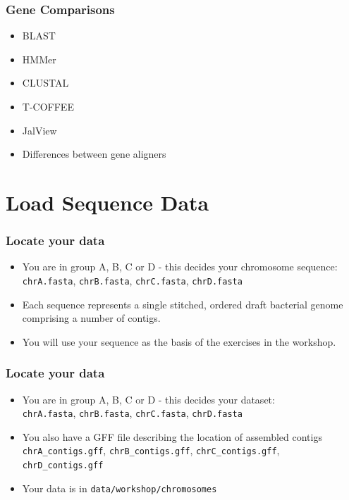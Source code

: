 \documentclass[table]{beamer}
\begin{document}
    \begin{frame}
     \frametitle{Gene Comparisons}
     \begin{itemize}
       \item BLAST
       \item HMMer
       \item CLUSTAL
       \item T-COFFEE
       \item JalView
       \item Differences between gene aligners
     \end{itemize}
    \end{frame}


  \section{Load Sequence Data}
  \begin{frame}
    \frametitle{Locate your data}
    \begin{itemize}
      \item You are in group A, B, C or D - this decides your chromosome sequence: \\
      \texttt{chrA.fasta}, \texttt{chrB.fasta}, \texttt{chrC.fasta}, \texttt{chrD.fasta}
      \item Each sequence represents a single stitched, ordered draft bacterial genome comprising a number of contigs.
      \item You will use your sequence as the basis of the exercises in the workshop.
    \end{itemize}
  \end{frame}
  
  \begin{frame}
    \frametitle{Locate your data}
    \begin{itemize}
      \item You are in group A, B, C or D - this decides your dataset: \\
      \texttt{chrA.fasta}, \texttt{chrB.fasta}, \texttt{chrC.fasta}, \texttt{chrD.fasta}
      \item You also have a GFF file describing the location of assembled contigs \\
      \texttt{chrA\_contigs.gff}, \texttt{chrB\_contigs.gff}, \texttt{chrC\_contigs.gff}, \texttt{chrD\_contigs.gff}
      \item Your data is in \texttt{data/workshop/chromosomes}
    \end{itemize}
  \end{frame}
  
\end{document}
